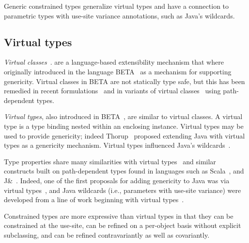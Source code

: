 
Generic constrained types generalize virtual types and 
have a connection to parametric types with use-site variance
annotations, such as Java's wildcards.  

\subsection{Virtual types}

{\em Virtual classes}~\cite{beta,mp89-virtual-classes,ernst06-virtual}.
are a language-based extensibility
mechanism that where
originally introduced in the language
BETA~\cite{beta} as a mechanism
for supporting genericity.
Virtual classes in BETA are not statically type safe, but this has been
remedied in recent formulations~\cite{ernst99-gbeta,ernst06-virtual} and in
variants of 
virtual classes~\cite{scala,nqm06,cdnw07-tribe,variant-path-types}
using path-dependent types.  

{\em Virtual types}, also introduced in BETA~\cite{beta},
are similar to virtual
classes.  A virtual type is a type binding nested within an
enclosing instance.
Virtual types
may be used to provide genericity; indeed
Thorup~\cite{thorup97} proposed extending Java with virtual types
as a genericity mechanism.  Virtual types influenced Java's 
wildcards~\cite{adding-wildcards,Java3,wildcards-safe}.


Type properties share many similarities with virtual
types~\cite{mp89-virtual-classes,beta,ernst99-gbeta,ernst06-virtual,cdnw07-tribe}
and similar constructs built on path-dependent types found in
languages such as Scala~\cite{scala}, and J\&~\cite{nqm06}.
Indeed, one of the first proposals for adding genericity to Java
was via virtual types~\cite{thorup97}, and Java
wildcards (i.e., parameters with use-site variance)
were developed from a line of work beginning with virtual
types~\cite{unifying-genericity,variant-parametric-types,adding-wildcards}.

Constrained types are more expressive than virtual
types in that they can be constrained at the use-site,
can be refined on a per-object basis without explicit subclassing,
and can be refined contravariantly
as well as covariantly.


